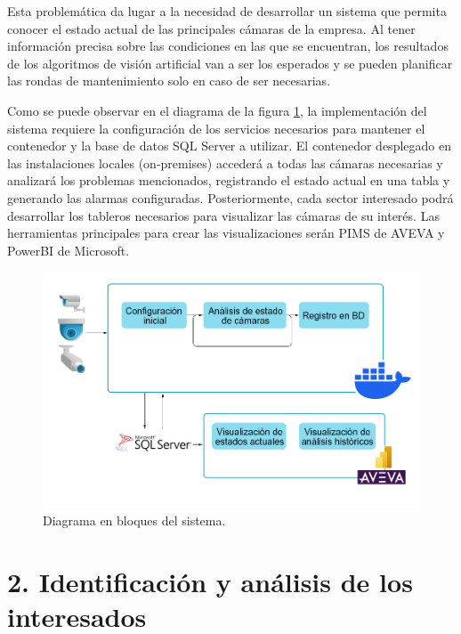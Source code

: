 \documentclass[
11pt, %
]{charter}
\begin{document}
Esta problemática da lugar a la necesidad de desarrollar un sistema que permita conocer el estado actual de las principales cámaras de la empresa. Al tener información precisa sobre las condiciones en las que se encuentran, los resultados de los algoritmos de visión artificial van a ser los esperados y se pueden planificar las rondas de mantenimiento solo en caso de ser necesarias. 

Como se puede observar en el diagrama de la figura \ref{fig:diagrama_solucion}, la implementación del sistema requiere la configuración de los servicios necesarios para mantener el contenedor y la base de datos SQL Server a utilizar. El contenedor desplegado en las instalaciones locales (on-premises) accederá a todas las cámaras necesarias y analizará los problemas mencionados, registrando el estado actual en una tabla y generando las alarmas configuradas. Posteriormente, cada sector interesado podrá desarrollar los tableros necesarios para visualizar las cámaras de su interés. Las herramientas principales para crear las visualizaciones serán PIMS de AVEVA y PowerBI de Microsoft.

\begin{figure}[htpb]
\centering 
\includegraphics[width=.95\textwidth]{./Figuras/diagrama_inicial.png}
\caption{Diagrama en bloques del sistema.}
\label{fig:diagrama_solucion}
\end{figure}

\section{2. Identificación y análisis de los interesados} %
\label{sec:interesados}
\end{document}
